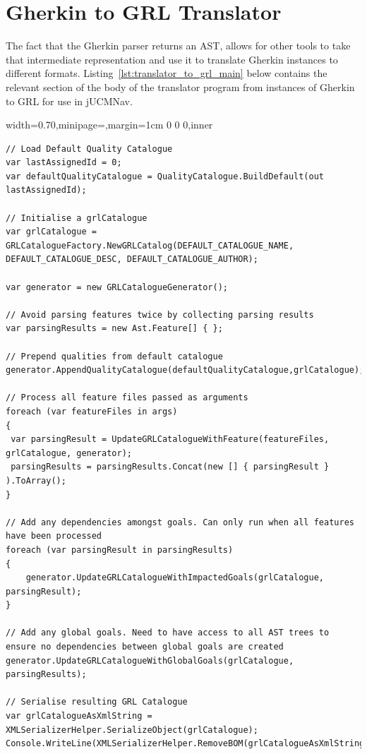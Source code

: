 \documentclass[dissertation,final]{softeng}
\newenvironment{featurecode}[1]
{ \lrbox\featurebox \begin{adjustbox}{width=#1\textwidth,minipage=\textwidth,margin=1cm 0 0 0,inner} }
{ \end{adjustbox}\endlrbox}
\newenvironment{featurelist}[2]
{
\newcommand{\setcaption}{\caption{#1}}
\newcommand{\setlabel}{\label{#2}}
}
{\begin{listing}[h!]\centering\usebox\featurebox\setcaption\setlabel\end{listing}}
\begin{document}
\clearpage
\section{Gherkin to GRL Translator}
\label{sec:grl_translator}
The fact that the Gherkin parser returns an AST, allows for other tools to take that intermediate representation and use it to translate Gherkin instances to different formats. Listing~\ref{lst:translator_to_grl_main} below contains the relevant section of the body of the translator program from instances of Gherkin to GRL for use in jUCMNav.

\begin{featurelist}{Translator to GRL -- main body}{lst:translator_to_grl_main}
\begin{featurecode}{0.70}
\begin{verbatim}
// Load Default Quality Catalogue
var lastAssignedId = 0;
var defaultQualityCatalogue = QualityCatalogue.BuildDefault(out lastAssignedId);

// Initialise a grlCatalogue
var grlCatalogue = GRLCatalogueFactory.NewGRLCatalog(DEFAULT_CATALOGUE_NAME, DEFAULT_CATALOGUE_DESC, DEFAULT_CATALOGUE_AUTHOR);

var generator = new GRLCatalogueGenerator();

// Avoid parsing features twice by collecting parsing results
var parsingResults = new Ast.Feature[] { };

// Prepend qualities from default catalogue
generator.AppendQualityCatalogue(defaultQualityCatalogue,grlCatalogue);

// Process all feature files passed as arguments
foreach (var featureFiles in args)
{
 var parsingResult = UpdateGRLCatalogueWithFeature(featureFiles, grlCatalogue, generator);
 parsingResults = parsingResults.Concat(new [] { parsingResult } ).ToArray();
}

// Add any dependencies amongst goals. Can only run when all features have been processed
foreach (var parsingResult in parsingResults)
{
    generator.UpdateGRLCatalogueWithImpactedGoals(grlCatalogue, parsingResult);
}

// Add any global goals. Need to have access to all AST trees to ensure no dependencies between global goals are created
generator.UpdateGRLCatalogueWithGlobalGoals(grlCatalogue, parsingResults);

// Serialise resulting GRL Catalogue
var grlCatalogueAsXmlString = XMLSerializerHelper.SerializeObject(grlCatalogue);
Console.WriteLine(XMLSerializerHelper.RemoveBOM(grlCatalogueAsXmlString));
\end{verbatim}
\end{featurecode}
\end{featurelist}
\end{document}
